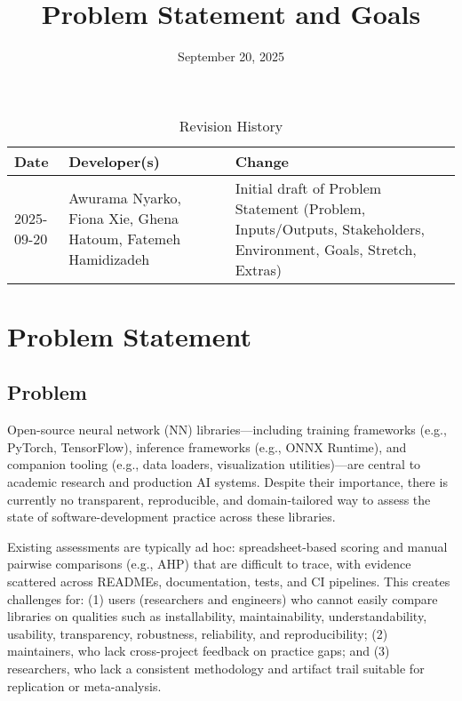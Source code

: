 \documentclass{article}
\title{Problem Statement and Goals\\\progname}
\author{\authname}
\date{September 20, 2025}
\begin{document}
\maketitle

\begin{table}[hp]
\caption{Revision History} \label{TblRevisionHistory}
\begin{tabularx}{\textwidth}{llX}
\toprule
\textbf{Date} & \textbf{Developer(s)} & \textbf{Change}\\
\midrule
    2025-09-20 & Awurama Nyarko, Fiona Xie, Ghena Hatoum, Fatemeh Hamidizadeh & Initial draft of Problem Statement (Problem, Inputs/Outputs, Stakeholders, Environment, Goals, Stretch, Extras)\\
\bottomrule
\end{tabularx}
\end{table}

\section{Problem Statement}



\subsection{Problem}
Open-source neural network (NN) libraries---including training frameworks
(e.g., PyTorch, TensorFlow), inference frameworks (e.g., ONNX Runtime),
and companion tooling (e.g., data loaders, visualization utilities)---are central
to academic research and production AI systems. Despite their importance,
there is currently no transparent, reproducible, and domain-tailored way to
assess the state of software-development practice across these libraries.

Existing assessments are typically ad hoc: spreadsheet-based scoring and
manual pairwise comparisons (e.g., AHP) that are difficult to trace, with
evidence scattered across READMEs, documentation, tests, and CI
pipelines. This creates challenges for: (1) users (researchers and engineers)
who cannot easily compare libraries on qualities such as installability,
maintainability, understandability, usability, transparency, robustness,
reliability, and reproducibility; (2) maintainers, who lack cross-project
feedback on practice gaps; and (3) researchers, who lack a consistent
methodology and artifact trail suitable for replication or meta-analysis.
\end{document}
